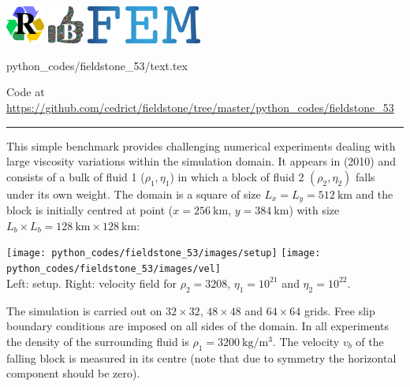 \includegraphics[height=1.25cm]{images/pictograms/replication}
\includegraphics[height=1.25cm]{images/pictograms/benchmark}
\includegraphics[height=1.25cm]{images/pictograms/FEM}

\begin{flushright} {\tiny {\color{gray} python\_codes/fieldstone\_53/text.tex}} \end{flushright}



\begin{center}
Code at \url{https://github.com/cedrict/fieldstone/tree/master/python_codes/fieldstone_53}
\end{center}

\par\noindent\rule{\textwidth}{0.4pt}

This simple benchmark provides challenging numerical experiments 
dealing with large viscosity variations within the simulation
domain. It appears in \textcite{gery10} (2010) and consists of a bulk of fluid 1 ($\rho_1,\eta_1$)
in which a block of fluid 2 $(\rho_2,\eta_2)$ falls under its own
weight. The domain is a square of size $L_x=L_y=512~\si{\km}$ and the
block is initially centred at point ($x=256~\si{\km}$, $y=384~\si{\km}$) with size
$L_b\times L_b = 128~\si{\km}\times 128~\si{\km}$:

\begin{center}
\texttt{[image: python\_codes/fieldstone\_53/images/setup]}
\texttt{[image: python\_codes/fieldstone\_53/images/vel]}\\
{\captionfont Left: setup. Right: velocity field for $\rho_2=3208$, $\eta_1=10^{21}$
and $\eta_2=10^{22}$.}
\end{center}

The simulation is carried out on $32\times32$, $48\times48$ and $64\times 64$ grids. Free slip
boundary conditions are imposed on all sides of the domain. 
In all experiments the density of the surrounding fluid is $\rho_1=3200~\si{\kg\per\cubic\meter}$.
The velocity $v_b$ of the falling block is measured in its centre (note that due to symmetry 
the horizontal component should be zero).

